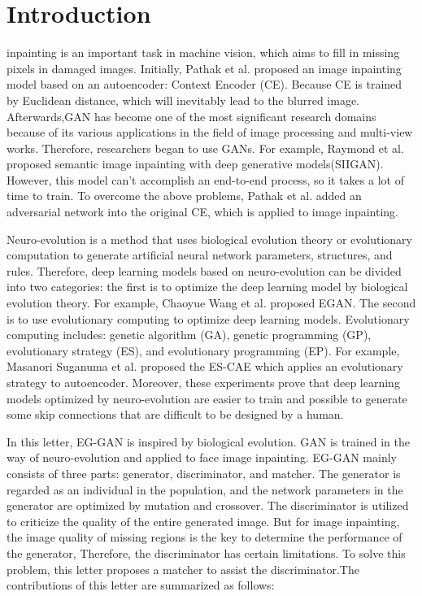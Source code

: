 \documentclass[journal]{IEEEtran}
\begin{document}
\IEEEpeerreviewmaketitle



\section{Introduction}

 inpainting is an important task in machine vision, which aims to fill in missing pixels in damaged images. Initially, Pathak et al. proposed an image inpainting model based on an autoencoder: Context Encoder (CE)\cite{pathak2016context}. Because CE is trained by Euclidean distance, which will inevitably lead to the blurred image\cite{yoo2016pixel}. Afterwards,GAN has become one of the most significant research domains because of its various applications in the field of image processing and multi-view works\cite{hu2019multi}\cite{hu2019multimodal}. Therefore, researchers began to use GANs. For example, Raymond et al. proposed semantic image inpainting with deep generative models(SIIGAN)\cite{yeh2017semantic}. However, this model can't accomplish an end-to-end process, so it takes a lot of time to train. To overcome the above problems, Pathak et al. added an adversarial network into the original CE, which is applied to image inpainting.

Neuro-evolution \cite{floreano2008neuroevolution} is a method that uses biological evolution theory or evolutionary computation to generate artificial neural network parameters, structures, and rules. Therefore, deep learning models based on neuro-evolution can be divided into two categories: the first is to optimize the deep learning model by biological evolution theory. For example, Chaoyue Wang et al. proposed EGAN\cite{wang2019evolutionary}. The second is to use evolutionary computing to optimize deep learning models. Evolutionary computing includes: genetic algorithm (GA), genetic programming (GP), evolutionary strategy (ES), and evolutionary programming (EP). For example, Masanori Suganuma et al. proposed the ES-CAE \cite{suganuma2018exploiting} which applies an evolutionary strategy to autoencoder. Moreover, these experiments prove that deep learning models optimized by neuro-evolution are easier to train and possible to generate some skip connections that are difficult to be designed by a human.

In this letter, EG-GAN is inspired by biological evolution. GAN is trained in the way of neuro-evolution and applied to face image inpainting. EG-GAN mainly consists of three parts: generator, discriminator, and matcher. The generator is regarded as an individual in the population, and the network parameters in the generator are optimized by mutation and crossover. The discriminator is utilized to criticize the quality of the entire generated image. But for image inpainting, the image quality of missing regions is the key to determine the performance of the generator, Therefore, the discriminator has certain limitations. To solve this problem, this letter proposes a matcher to assist the discriminator.The contributions of this letter are summarized as follows:
\end{document}
